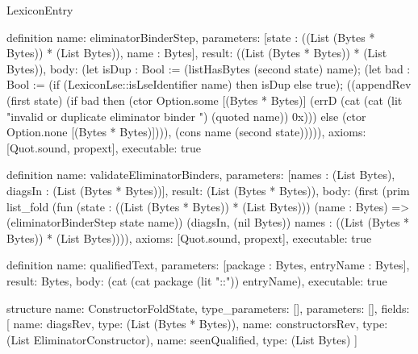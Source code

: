 \begin{lexlean}{LexiconEntry}
\begin{semanticmodule}
definition{
  name: eliminatorBinderStep,
  parameters: [state : ((List (Bytes * Bytes)) * (List Bytes)), name : Bytes],
  result: ((List (Bytes * Bytes)) * (List Bytes)),
  body: (let isDup : Bool := (listHasBytes (second state) name); (let bad : Bool := (if (LexiconLse::isLseIdentifier name) then isDup else true); ((appendRev (first state) (if bad then (ctor Option.some [(Bytes * Bytes)] (errD (cat (cat (lit "invalid or duplicate eliminator binder ") (quoted name)) 0x))) else (ctor Option.none [(Bytes * Bytes)]))), (cons name (second state))))),
  axioms: [Quot.sound, propext],
  executable: true
}

definition{
  name: validateEliminatorBinders,
  parameters: [names : (List Bytes), diagsIn : (List (Bytes * Bytes))],
  result: (List (Bytes * Bytes)),
  body: (first (prim list_fold (fun (state : ((List (Bytes * Bytes)) * (List Bytes))) (name : Bytes) => (eliminatorBinderStep state name)) (diagsIn, (nil Bytes)) names : ((List (Bytes * Bytes)) * (List Bytes)))),
  axioms: [Quot.sound, propext],
  executable: true
}

definition{
  name: qualifiedText,
  parameters: [package : Bytes, entryName : Bytes],
  result: Bytes,
  body: (cat (cat package (lit "::")) entryName),
  executable: true
}

structure{
  name: ConstructorFoldState,
  type_parameters: [],
  parameters: [],
  fields: [
    {name: diagsRev, type: (List (Bytes * Bytes))},
    {name: constructorsRev, type: (List EliminatorConstructor)},
    {name: seenQualified, type: (List Bytes)}
  ]
}


\end{semanticmodule}
\end{lexlean}
